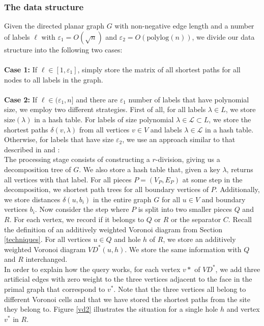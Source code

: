 \subsubsection{The data structure}
Given the directed planar graph $G$ with non-negative edge length and a number of labels $\ell$ with
$\varepsilon_1 = O(\sqrt{n})$ and $\varepsilon_2=O(\text{polylog}(n))$, we divide our
data structure into the following two cases: \\
\\
\textbf{Case 1:} If $\ell\in [1, \varepsilon_1]$, simply store the matrix of all shortest paths for all nodes to all
labels in the graph. \\
\\
\textbf{Case 2:} If $\ell\in (\varepsilon_1, n]$ and there are $\varepsilon_1$ number of labels that have
polynomial size, we employ two different strategies. First of all, for all labels
$\lambda\in L$, we
store $\text{size}(\lambda)$ in a hash table. For labels of size polynomial
$\lambda \in \mathcal{L} \subset L$, we store the
shortest paths $\delta(v, \lambda)$ from all vertices $v\in V$ and labels $\lambda\in
\mathcal{L}$ in a hash table. Otherwise, for labels that have size
$\varepsilon_2$, we
use an approach similar to that described in \cite{cohen2017fast} and
\cite{gawrychowski2017better}: \\
\indent The processing stage consists of constructing a $r$-division,
giving us a decomposition tree of $G$. We also store a hash table that, given a key
$\lambda$, returns all vertices with that label. For all pieces $P=(V_P, E_P)$ at some
step in the decomposition, we shortest path trees for all boundary vertices of $P$.
Additionally, we store distances $\delta(u,b_i)$ in the entire graph $G$ for all $u\in V$ and boundary vertices $b_i$. Now
consider the step where $P$ is split into two smaller pieces $Q$ and $R$. For each
vertex, we record if it belongs to $Q$ or $R$ or the separator $C$. Recall the definition of an
additively weighted Voronoi diagram from Section \ref{techniques}. For all vertices $u\in
Q$ and hole $h$ of $R$, we store an additively weighted
Voronoi diagram $VD^*(u,h)$. We store the
same information with $Q$ and $R$ interchanged. \\
In order to explain how the
query works, for each vertex $v*$ of $VD^*$, we add three artificial edges with zero
weight to the three vertices adjacent
to the face in the primal graph that correspond to $v^*$. Note that the three vertices all
belong to different Voronoi cells and that we have stored the shortest paths from the site they
belong to. Figure \ref{vd2} illustrates the
situation for a single hole $h$ and vertex $v^*$ in $R$.

